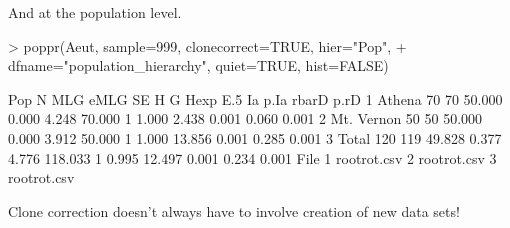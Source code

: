 \documentclass[letterpaper]{article}
\begin{document}
And at the population level.
\begin{Schunk}
\begin{Sinput}
> poppr(Aeut, sample=999, clonecorrect=TRUE, hier="Pop", 
+       dfname="population_hierarchy", quiet=TRUE, hist=FALSE)
\end{Sinput}
\end{Schunk}
\begin{Schunk}
\begin{Soutput}
         Pop   N MLG   eMLG    SE     H       G Hexp   E.5     Ia  p.Ia rbarD  p.rD
1     Athena  70  70 50.000 0.000 4.248  70.000    1 1.000  2.438 0.001 0.060 0.001
2 Mt. Vernon  50  50 50.000 0.000 3.912  50.000    1 1.000 13.856 0.001 0.285 0.001
3      Total 120 119 49.828 0.377 4.776 118.033    1 0.995 12.497 0.001 0.234 0.001
         File
1 rootrot.csv
2 rootrot.csv
3 rootrot.csv
\end{Soutput}
\end{Schunk}
Clone correction doesn't always have to involve creation of new data sets!
\end{document}
